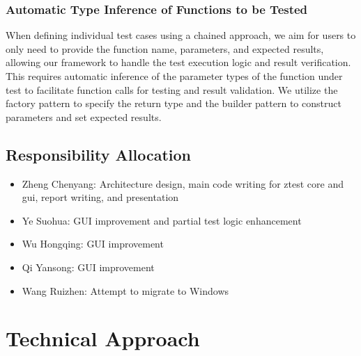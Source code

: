 \documentclass{article}
\begin{document}
\subsubsection{Automatic Type Inference of Functions to be Tested}
When defining individual test cases using a chained approach, we aim for users to only need to provide the function name, parameters, and expected results, allowing our framework to handle the test execution logic and result verification. This requires automatic inference of the parameter types of the function under test to facilitate function calls for testing and result validation. We utilize the factory pattern to specify the return type and the builder pattern to construct parameters and set expected results.
\subsection{Responsibility Allocation}
\begin{itemize}[leftmargin=*]
    \item Zheng Chenyang: Architecture design, main code writing for ztest core and gui, report writing, and presentation
    \item Ye Suohua: GUI improvement and partial test logic enhancement
    \item Wu Hongqing: GUI improvement
    \item Qi Yansong: GUI improvement
    \item Wang Ruizhen: Attempt to migrate to Windows
\end{itemize}

\section{Technical Approach}
\end{document}
